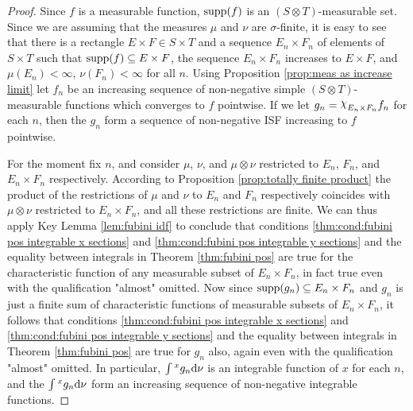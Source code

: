 \begin{proof}
Since $f$ is a measurable function, $\car{f}$ is an $(S\otimes T)$-measurable set. Since we are assuming that the measures $\mu$ and $\nu$ are $\sigma$-finite, it is easy to see that there is a rectangle $E\times F\in S\times T$ and a sequence $E_n\times F_n$ of elements of $S\times T$ such that $\car{f}\subseteq E\times F$, the sequence $E_n\times F_n$ increases to $E\times F$, and $\mu(E_n)<\infty$, $\nu(F_n)<\infty$ for all $n$. Using Proposition \ref{prop:meas as increase limit} let $f_n$ be an increasing sequence of non-negative simple $(S\otimes T)$-measurable functions which converges to $f$ pointwise. If we let $g_n=\idf{E_n\times F_n}f_n$ for each $n$, then the $g_n$ form a sequence of non-negative ISF increasing to $f$ pointwise.

For the moment fix $n$, and consider $\mu$, $\nu$, and $\mu\otimes\nu$ restricted to $E_n$, $F_n$, and $E_n\times F_n$ respectively. According to Proposition \ref{prop:totally finite product} the product of the restrictions of $\mu$ and $\nu$ to $E_n$ and $F_n$ respectively coincides with $\mu\otimes\nu$ restricted to $E_n\times F_n$, and all these restrictions are finite. We can thus apply Key Lemma \ref{lem:fubini idf} to conclude that conditions \ref{thm:cond:fubini pos integrable x sections} and \ref{thm:cond:fubini pos integrable y sections} and the equality between integrals in Theorem \ref{thm:fubini pos} are true for the characteristic function of any measurable subset of $E_n\times F_n$, in fact true even with the qualification "almost" omitted. Now since $\car{g_n}\subseteq E_n\times F_n$ and $g_n$ is just a finite sum of characteristic functions of measurable subsets of $E_n\times F_n$, it follows that conditions \ref{thm:cond:fubini pos integrable x sections} and \ref{thm:cond:fubini pos integrable y sections} and the equality between integrals in Theorem \ref{thm:fubini pos} are true for $g_n$ also, again even with the qualification "almost" omitted. In particular, $\int\xsec{g_n}{x}\dd\nu$ is an integrable function of $x$ for each $n$, and the $\int\xsec{g_n}{x}\dd\nu$ form an increasing sequence of non-negative integrable functions.


\end{proof}
